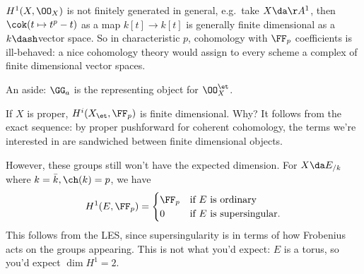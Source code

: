 \begin{center}
\end{center}

\begin{remark}

\(H^1(X, \OO_X)\) is not finitely generated in general, e.g.~take
\(X \da \AA^1\), then \(\cok(t\mapsto t^p - t)\) as a map
\(k[t] \to k[t]\) is generally finite dimensional as a \(k\dash\)vector
space. So in characteristic \(p\), cohomology with \(\FF_p\)
coefficients is ill-behaved: a nice cohomology theory would assign to
every scheme a complex of finite dimensional vector spaces.

\end{remark}

\begin{remark}

An aside: \(\GG_a\) is the representing object for \(\OO_X^\et\).

\end{remark}

\begin{remark}

If \(X\) is proper, \(H^i(X_\et, \FF_p)\) is finite dimensional. Why? It
follows from the exact sequence: by proper pushforward for coherent
cohomology, the terms we're interested in are sandwiched between finite
dimensional objects.

\end{remark}

\begin{example}[?]

However, these groups still won't have the expected dimension. For
\(X \da E_{/k}\) where \(k=\bar k, \ch(k) = p\), we have
\begin{align*}  
H^1(E, \FF_p) = 
\begin{cases}
\FF_p & \text{if $E$ is ordinary} \\
0 & \text{if $E$ is supersingular}.
\end{cases}
\end{align*} This follows from the LES, since supersingularity is in
terms of how Frobenius acts on the groups appearing. This is not what
you'd expect: \(E\) is a torus, so you'd expect \(\dim H^1 = 2\).

\end{example}


